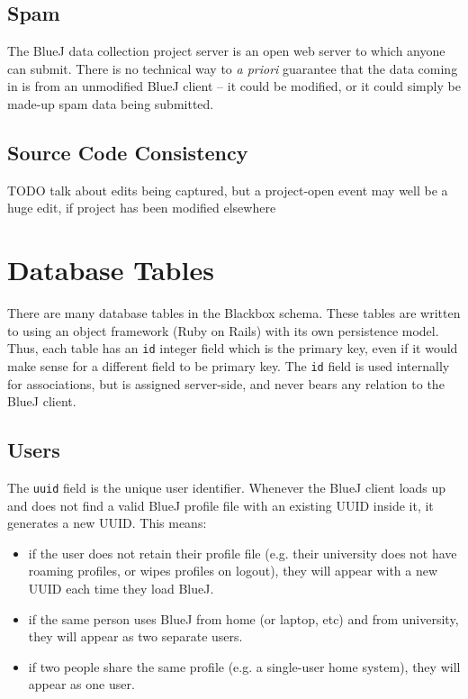 \documentclass{book}
\begin{document}
\section{Spam}
\label{def:spam}

The BlueJ data collection project server is an open web server to which anyone
can submit.  There is no technical way to \textit{a priori} guarantee that the
data coming in is from an unmodified BlueJ client -- it could be modified, or
it could simply be made-up spam data being submitted.

\section{Source Code Consistency}

TODO talk about edits being captured, but a project-open event may well be a
huge edit, if project has been modified elsewhere

\chapter{Database Tables}

There are many database tables in the Blackbox schema.  These tables are
written to using an object framework (Ruby on Rails) with its own persistence
model.  Thus, each table has an \verb$id$ integer field which is the primary
key, even if it would make sense for a different field to be primary key.  The
\texttt{id} field is used internally for associations, but is assigned
server-side, and never bears any relation to the BlueJ client.

\section{Users}


The \texttt{uuid} field is the unique user identifier.  Whenever the BlueJ
client loads up and does not find a valid BlueJ profile file with an existing
UUID inside it, it generates a new UUID.  This means:

\begin{itemize}
\item if the user does not retain their profile file (e.g. their university
  does not have roaming profiles, or wipes profiles on logout), they will
  appear with a new UUID each time they load BlueJ.
\item if the same person uses BlueJ from home (or laptop, etc) and from
  university, they will appear as two separate users.
\item if two people share the same profile (e.g. a single-user home system),
  they will appear as one user.
\end{itemize}
\end{document}
